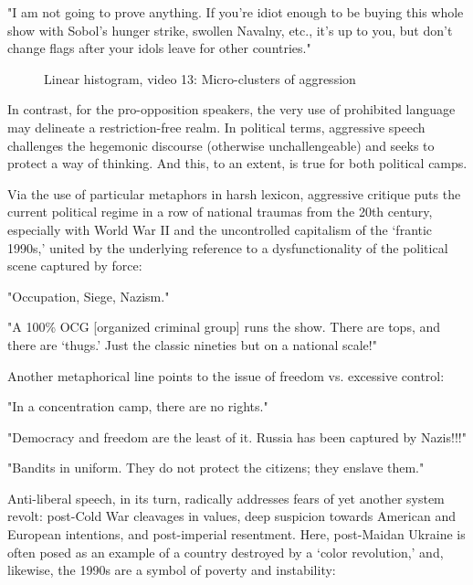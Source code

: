 \hspace{\parindent}"I am not going to prove anything. If you’re idiot enough to be buying this whole show with Sobol’s hunger strike, swollen Navalny, etc., it’s up to you, but don’t change flags after your idols leave for other countries."

\begin{figure}[ht]
	\caption{Linear histogram, video 13: Micro-clusters of aggression}\label{fig:video13Histogram}
\end{figure}

In contrast, for the pro-opposition speakers, the very use of prohibited language may delineate a restriction-free realm. In political terms, aggressive speech challenges the hegemonic discourse (otherwise unchallengeable) and seeks to protect a way of thinking. And this, to an extent, is true for both political camps.

Via the use of particular metaphors in harsh lexicon, aggressive critique puts the current political regime in a row of national traumas from the 20th century, especially with World War II and the uncontrolled capitalism of the ‘frantic 1990s,’ united by the underlying reference to a dysfunctionality of the political scene captured by force:

\hspace{\parindent}"Occupation, Siege, Nazism."

\hspace{\parindent}"A 100\% OCG [organized criminal group] runs the show. There are tops, and there are ‘thugs.’ Just the classic nineties but on a national scale!"

Another metaphorical line points to the issue of freedom vs. excessive control:

\hspace{\parindent}"In a concentration camp, there are no rights."

\hspace{\parindent}"Democracy and freedom are the least of it. Russia has been captured by Nazis!!!"

\hspace{\parindent}"Bandits in uniform. They do not protect the citizens; they enslave them."

Anti-liberal speech, in its turn, radically addresses fears of yet another system revolt: post-Cold War cleavages in values, deep suspicion towards American and European intentions, and post-imperial resentment. Here, post-Maidan Ukraine is often posed as an example of a country destroyed by a ‘color revolution,’ and, likewise, the 1990s are a symbol of poverty and instability:

